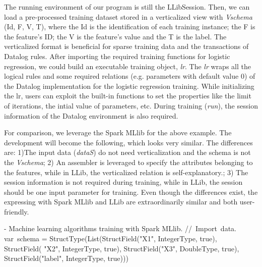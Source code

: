 \eldl
The running environment of our program is still the LLibSession. Then, we can load a pre-processed training dataset stored in a verticalized view with \textit{Vschema} (Id, F, V, T), where the Id is the identification of each training instance; the F is the feature's ID; the V is the feature's value and the T is the label. The verticalized format is beneficial for sparse training data and the transactions of Datalog rules.   After importing the required training functions for logistic regression, we could build an executable training object, \textit{lr}. The \textit{lr} wraps all the logical rules and some required relations (e.g. parameters with default value 0) of the Datalog implementation for the logistic regression training.  While initializing the lr, users can exploit the built-in functions to set the properties like the limit of  iterations, the intial value of parameters, etc. During training (\textit{run}), the session information of the Datalog environment is also required. 

For comparison, we leverage the Spark MLlib for the above example. The development will become the following, which looks very similar. The differences are: 1)The  input data (\textit{dataS}) do not need verticalization and the schema is not the \textit{Vschema}; 2) An assembler is leveraged to specify the attributes belonging to the features, while in LLib, the verticalized relation is self-explanatory.; 3) The session information is not required during training, while in LLib, the session should be one input parameter for training.
Even though the differences exist, the expressing with Spark MLlib and LLib are extraordinarily similar and both user-friendly.

\vspace{0.5em}
 - Machine learning algorithms training with Spark MLlib.
\bldl
//\ Import\ data. \\
var\ schema = StructType(List(StructField("X1", IntegerType, true), \\StructField(
"X2", IntegerType, true),
StructField("X3", DoubleType, true),\\ StructField("label", IntegerType, true))) \\

